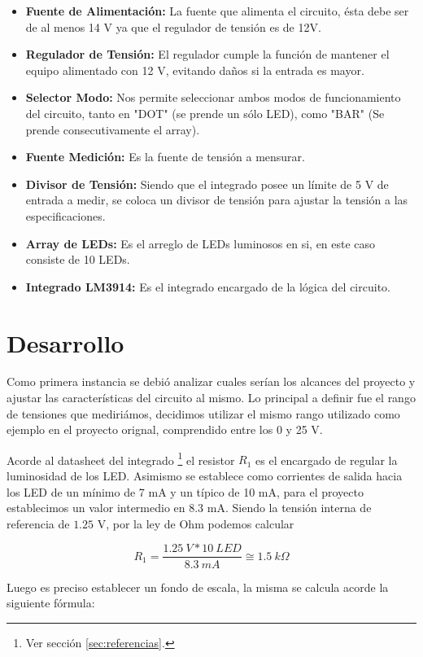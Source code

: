 \documentclass[12pt,a4paper]{article}
\begin{document}
	\begin{itemize}
		\item \textbf{Fuente de Alimentación:} La fuente que alimenta el circuito, ésta debe ser de al menos 14 V ya que el regulador de tensión es de 12V.
		\item \textbf{Regulador de Tensión:} El regulador cumple la función de mantener el equipo alimentado con 12 V, evitando daños si la entrada es mayor.
		\item \textbf{Selector Modo:} Nos permite seleccionar ambos modos de funcionamiento del circuito, tanto en "DOT" (se prende un sólo LED), como "BAR" (Se prende consecutivamente el array).
		\item \textbf{Fuente Medición:} Es la fuente de tensión a mensurar.
		\item \textbf{Divisor de Tensión:} Siendo que el integrado posee un límite de 5 V de entrada a medir, se coloca un divisor de tensión para ajustar la tensión a las especificaciones.
		\item \textbf{Array de LEDs:} Es el arreglo de LEDs luminosos en si, en este caso consiste de 10 LEDs.
		\item \textbf{Integrado LM3914: } Es el integrado encargado de la lógica del circuito.
	\end{itemize}

	\section{Desarrollo}
		Como primera instancia se debió analizar cuales serían los alcances del proyecto y ajustar las características del circuito al mismo. Lo principal a definir fue el rango de tensiones que mediriámos, decidimos utilizar el mismo rango utilizado como ejemplo en el proyecto orignal, comprendido entre los 0 y 25 V.

		Acorde al datasheet del integrado \footnote{Ver sección \ref{sec:referencias}.} el resistor $R_1$ es el encargado de regular la luminosidad de los LED. Asimismo se establece como corrientes de salida hacia los LED de un mínimo de 7 mA y un típico de 10 mA, para el proyecto establecimos un valor intermedio en $8.3$ mA. Siendo la tensión interna de referencia de $1.25$ V, por la ley de Ohm podemos calcular

		\begin{equation}
			R_1 = \frac{1.25 \: V * 10 \: LED}{8.3 \: mA} \cong 1.5 \: k \Omega
		\end{equation}

		Luego es preciso establecer un fondo de escala, la misma se calcula acorde la siguiente fórmula:
\end{document}
